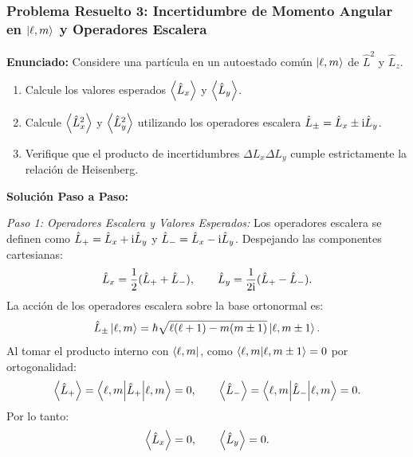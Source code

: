 \subsubsection[Problema 3: Incertidumbre de momento angular en $\ket{\ell, m}$]{Problema Resuelto 3: Incertidumbre de Momento Angular en $\ket{\ell, m}$ y Operadores Escalera}
\begin{ejemplobox}
    \textbf{Enunciado:} Considere una partícula en un autoestado común $\ket{\ell, m}$ de $\hat{L}^2$ y $\hat{L}_z$.
    \begin{enumerate}
        \item Calcule los valores esperados $\left\langle \hat{L}_x \right\rangle$ y $\left\langle \hat{L}_y \right\rangle$.
        \item Calcule $\left\langle \hat{L}_x^2 \right\rangle$ y $\left\langle \hat{L}_y^2 \right\rangle$ utilizando los operadores escalera $\hat{L}_\pm = \hat{L}_x \pm \mathrm{i}\hat{L}_y$.
        \item Verifique que el producto de incertidumbres $\Delta L_x \Delta L_y$ cumple estrictamente la relación de Heisenberg.
    \end{enumerate}

    \textbf{Solución Paso a Paso:}

    \textit{Paso 1: Operadores Escalera y Valores Esperados:}
    Los operadores escalera se definen como $\hat{L}_+ = \hat{L}_x + \mathrm{i}\hat{L}_y$ y $\hat{L}_- = \hat{L}_x - \mathrm{i}\hat{L}_y$. Despejando las componentes cartesianas:
    \begin{equation}
        \hat{L}_x = \frac{1}{2}(\hat{L}_+ + \hat{L}_-), \qquad \hat{L}_y = \frac{1}{2\mathrm{i}}(\hat{L}_+ - \hat{L}_-).
    \end{equation}
    La acción de los operadores escalera sobre la base ortonormal es:
    \begin{equation}
        \hat{L}_\pm \left| \ell, m \right\rangle = \hbar\sqrt{\ell(\ell+1) - m(m\pm 1)}\left| \ell, m\pm 1 \right\rangle.
    \end{equation}
    Al tomar el producto interno con $\left\langle \ell, m \right|$, como $\left\langle \ell, m \middle| \ell, m\pm 1 \right\rangle = 0$ por ortogonalidad:
    \begin{equation}
        \left\langle \hat{L}_+ \right\rangle = \left\langle \ell, m \middle| \hat{L}_+ \middle| \ell, m \right\rangle = 0, \qquad \left\langle \hat{L}_- \right\rangle = \left\langle \ell, m \middle| \hat{L}_- \middle| \ell, m \right\rangle = 0.
    \end{equation}
    Por lo tanto:
    \begin{equation}
        \left\langle \hat{L}_x \right\rangle = 0, \qquad \left\langle \hat{L}_y \right\rangle = 0.
    \end{equation}


\end{ejemplobox}
